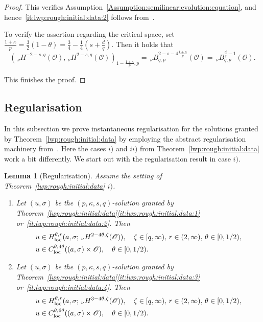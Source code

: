 \documentclass[reqno]{amsart}
\newtheorem{lemma}[Satz]{Lemma}
\newcommand{\sO}{\mathscr{O}}
\newcommand{\1}{\mathbf{1}}
\newcommand{\loc}{\textup{loc}}
\newcommand{\nH}{\ensuremath{\,_\nu H}}
\newcommand{\bpsn}[1]{\ensuremath{\nH^{#1}(\sO)}}
\begin{document}
\begin{proof}
		This verifies Assumption~\ref{Assumption:semilinear:evolution:equation}, and hence~\ref{it:lwp:rough:initial:data:2} follows from~\cite[Theorem 4.3]{agrestiNonlinearParabolicStochastic2022a}.
        
        To verify the assertion regarding the critical space, set $\frac{1+\kappa}{p}=\frac{3}{2}(1-\theta)=\frac34-\frac14(s+\frac{d}{q})$. Then it holds that 
        $$ (\bpsn{-2-s,q},\bpsn{2-s,q})_{1-\frac{1+\kappa}{p},p}=\,_\nu B_{q,p}^{2-s-4\frac{1+\kappa}{p}}(\sO)=\,_\nu B_{q,p}^{\frac{d}{q}-1}(\sO). $$



        
        This finishes the proof.
         
	\end{proof}
	\subsection{Regularisation}
	In this subsection we prove instantaneous regularisation for the solutions granted by Theorem~\ref{lwp:rough:initial:data} by employing the abstract regularisation machinery from~\cite[Section 6]{agrestiNonlinearParabolicStochastic2022a}. Here the cases $i)$ and $ii)$ from Theorem~\ref{lwp:rough:initial:data} work a bit differently. We start out with the regularisation result in case $i)$. 
	\begin{lemma}[Regularisation]\label{thm:regularization:rough:initial:data:LpLq}
		Assume the setting of Theorem~\ref{lwp:rough:initial:data} $i)$.
		\begin{enumerate}
			\item\label{it::regularization:rough:initial:data:LpLq:1} Let $(u,\sigma)$ be the $(p,\kappa,s,q)$-solution granted by Theorem~\ref{lwp:rough:initial:data}\ref{it:lwp:rough:initial:data:1} or~\ref{it:lwp:rough:initial:data:2}. Then
			\begin{align}
				u&\in H^{\theta,r}_{\loc}(a,\sigma; \nH^{2-4\theta,\zeta}(\sO)), \quad \zeta\in [q,\infty),\, r\in (2,\infty),\, \theta\in [0,1/2),\\
				u &\in C_{\loc}^{\theta,4\theta}((a,\sigma)\times \sO), \quad \theta \in [0,1/2).
			\end{align}
			\item\label{it::regularization:rough:initial:data:LpLq:2} Let $(u,\sigma)$ be the $(p,\kappa,s,q)$-solution granted by Theorem~\ref{lwp:rough:initial:data}\ref{it:lwp:rough:initial:data:3} or~\ref{it:lwp:rough:initial:data:4}. Then 
			\begin{align}
				u&\in H^{\theta,r}_{\loc}(a,\sigma; \nH^{3-4\theta,\zeta}(\sO)), \quad \zeta\in [q,\infty),\, r\in (2,\infty),\, \theta\in [0,1/2),\\
				u &\in C_{\loc}^{\theta,6\theta}((a,\sigma)\times \sO), \quad \theta \in [0,1/2).
			\end{align}
		\end{enumerate}
	\end{lemma}
\end{document}
